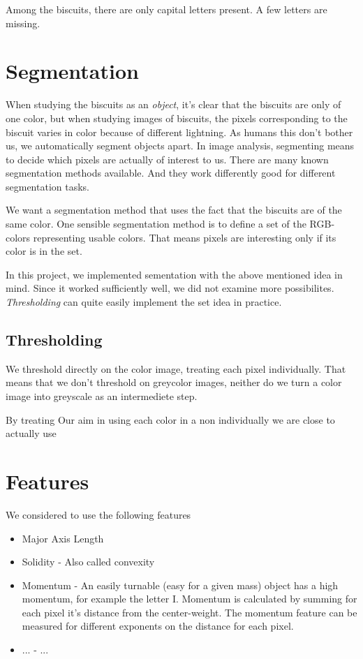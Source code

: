 \documentclass[a4paper,11pt]{article}
\begin{document}
Among the biscuits, there are only capital letters present. A few letters are missing.

\section{Segmentation}

When studying the biscuits as an \emph{object},
it's clear that the biscuits are only of one color,
but when studying images of biscuits, 
the pixels corresponding to the biscuit varies in color because of different lightning.
As humans this don't bother us, we automatically segment objects apart.
In image analysis, segmenting means to decide which pixels are actually of interest to us.
There are many known segmentation methods available.
And they work differently good for different segmentation tasks.

We want a segmentation method that uses the fact that the biscuits are of the same color.
One sensible segmentation method is to define a set of the RGB-colors representing usable colors.
That means pixels are interesting only if its color is in the set.

In this project, we implemented sementation with the above mentioned idea in mind.
Since it worked sufficiently well, we did not examine more possibilites. 
\emph{Thresholding} can quite easily implement the set idea in practice.



\subsection{Thresholding}
We threshold directly on the color image, treating each pixel individually. 
That means that we don't threshold on greycolor images,
neither do we turn a color image into greyscale as an intermediete step.

By treating 
Our aim in using each color in a non individually we are close to actually use




\section{Features}
We considered to use the following features
\begin{itemize}
\item Major Axis Length
\item Solidity - Also called convexity
\item Momentum - An easily turnable (easy for a given mass) object has a high momentum, for example the letter I. Momentum is calculated by summing for each pixel it's distance from the center-weight. The momentum feature can be measured for different exponents on the distance for each pixel.
\item ... - ...
\end{itemize}
\end{document}
